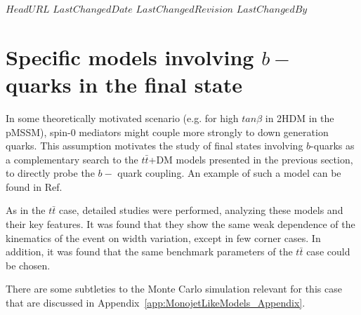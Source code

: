 \svnidlong
{$HeadURL$}
{$LastChangedDate$}
{$LastChangedRevision$}
{$LastChangedBy$}

\section{Specific models involving $b-$ quarks in the final state}

In some theoretically motivated scenario (e.g. for high $tan\beta$ in 2HDM in the pMSSM), 
spin-0 mediators might couple more strongly to down generation quarks.
 This assumption motivates the study of final states involving $b$-quarks 
 as a complementary search to the $t\bar
t$+DM models presented in the previous section, to directly probe the $b-$ quark coupling. 
An example of such a model can be found in Ref.~\cite{Buckley:2014fba}

As in the $t\bar t$ case, detailed studies were performed, analyzing 
these models and their key features. It was found that they show the
same weak dependence of the kinematics of the event on width
variation, except in few corner cases. In addition, it was found that
the same benchmark parameters of the $t\bar t$ case could be chosen.

There are some subtleties to the Monte Carlo simulation relevant for
this case that are discussed in Appendix~\ref{app:MonojetLikeModels_Appendix}.

%
%
